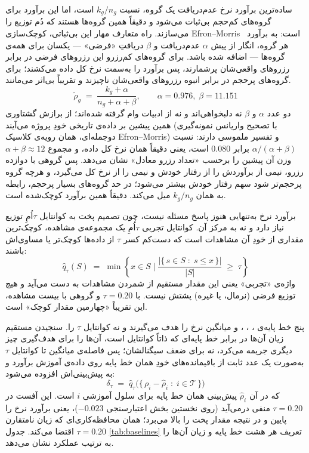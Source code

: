 ساده‌ترین برآورد نرخ عدم‌دریافت یک گروه، نسبت $k_g/n_g$ است، اما این برآورد برای
گروه‌های کم‌حجم بی‌ثبات می‌شود و دقیقاً همین گروه‌ها هستند که دُم توزیع را می‌سازند. راه
متعارف مهار این بی‌ثباتی، کوچک‌سازی Efron--Morris~\cite{EfronMorris75stein} است: به
برآورد هر گروه، انگار از پیش $\alpha$ عدم‌دریافت و $\beta$ دریافتِ «فرضی» —
یکسان برای همه‌ی گروه‌ها — اضافه شده باشد. برای گروه‌های کم‌رزرو این رزروهای فرضی در
برابر رزروهای واقعی‌شان پرشمارند، پس برآورد را به‌سمت نرخ کل داده می‌کشند؛ برای
گروه‌های پرحجم در برابر انبوه رزروهای واقعی‌شان ناچیزند و تقریباً بی‌اثر می‌مانند.
\begin{equation}
\tilde\rho_g \;=\; \frac{k_g + \alpha}{n_g + \alpha + \beta},
\qquad \alpha = 0.976,\; \beta = 11.151
\label{eq:shrunk}
\end{equation}
دو عدد $\alpha$ و $\beta$ نه دلبخواهی‌اند و نه از ادبیات وام گرفته شده‌اند؛ از برازش
گشتاوری همین پیشین بر داده‌ی تاریخی خودِ پروژه می‌آیند (با تصحیح واریانس نمونه‌گیری
دوجمله‌ای، همان رویه‌ی کلاسیک Efron--Morris) و تفسیر ملموسی دارند: نسبت
$\alpha/(\alpha+\beta)$ برابر $0.080$ است، یعنی دقیقاً همان نرخ کل داده، و مجموع
$\alpha + \beta \approx 12$ وزن آن پیشین را برحسب «تعداد رزرو معادل» نشان می‌دهد. پس
گروهی با دوازده رزرو، نیمی از برآوردش را از رفتار خودش و نیمی را از نرخ کل می‌گیرد، و
هرچه گروه پرحجم‌تر شود سهم رفتار خودش بیشتر می‌شود؛ در حد گروه‌های بسیار پرحجم، رابطه به
همان $k_g/n_g$ میل می‌کند.  دقیقاً همین برآورد کوچک‌شده است.

برآورد نرخ به‌تنهایی هنوز پاسخ مسئله نیست، چون تصمیم پخت به کوانتایل $\tau$اُمِ توزیع
نیاز دارد و نه به مرکز آن. کوانتایل تجربی $\tau$اُمِ یک مجموعه‌ی مشاهده، کوچک‌ترین
مقداری از خودِ آن مشاهدات است که دست‌کم کسر $\tau$ از داده‌ها کوچک‌تر یا مساوی‌اش باشند:
\begin{equation}
\hat q_\tau(S) \;=\; \min\left\{ x \in S \;\Big|\; \frac{\left|\{\, s \in S \;:\; s \le x \,\}\right|}{|S|} \;\ge\; \tau \right\}
\label{eq:emp-quantile}
\end{equation}
واژه‌ی «تجربی» یعنی این مقدار مستقیم از شمردن مشاهدات به دست می‌آید و هیچ توزیع فرضی
(نرمال،  یا غیره) پشتش نیست. با $\tau = 0.20$ و گروهی با بیست مشاهده، این
تقریباً «چهارمین مقدار کوچک» است.

پنج خط پایه‌ی ، ، ،  و  میانگین نرخ را هدف
می‌گیرند و نه کوانتایل $\tau$ را. سنجیدن مستقیم زیان  آن‌ها در برابر خط
پایه‌ای که ذاتاً کوانتایل است، آن‌ها را برای هدف‌گیری چیز دیگری جریمه می‌کرد، نه برای ضعف
سیگنالشان؛ پس فاصله‌ی میانگین تا کوانتایل $\tau$ به‌صورت یک عدد ثابت از باقیمانده‌های
خودِ همان خط پایه روی داده‌ی آموزش برآورد و به پیش‌بینی‌اش افزوده می‌شود:
\begin{equation}
\delta_\tau \;=\; \hat q_\tau\big(\{\, \rho_i - \hat\rho_i \;:\; i \in \mathcal{T} \,\}\big)
\label{eq:offset}
\end{equation}
که در آن $\hat\rho_i$ پیش‌بینی همان خط پایه برای سلول آموزشی $i$ است. این آفست در
$\tau = 0.20$ منفی درمی‌آید (روی نخستین بخش اعتبارسنجی $-0.023$)، یعنی برآورد نرخ را
پایین و در نتیجه مقدار پخت را بالا می‌برد؛ همان محافظه‌کاری‌ای که زیان نامتقارن
$\tau = 0.20$ اقتضا می‌کند. جدول \ref{tab:baselines} تعریف هر هشت خط پایه و زیان
 آن‌ها را به ترتیب عملکرد نشان می‌دهد.

